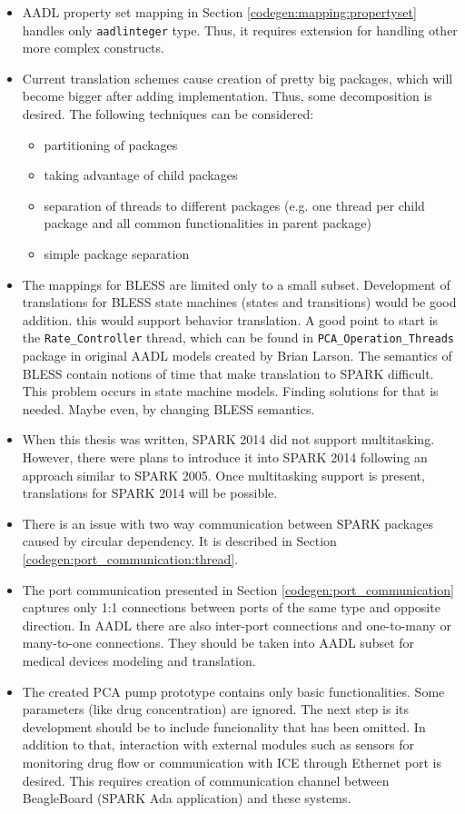 \begin{itemize}
	\item AADL property set mapping in Section \ref{codegen:mapping:propertyset} handles only \lstinline{aadlinteger} type. Thus, it requires extension for handling other more complex constructs.
	\item Current translation schemes cause creation of pretty big packages, which will become bigger after adding implementation. Thus, some decomposition is desired. The following techniques can be considered: 
		\begin{itemize}
			\item partitioning of packages
			\item taking advantage of child packages
			\item separation of threads to different packages (e.g. one thread per child package and all common functionalities in parent package)
			\item simple package separation
		\end{itemize} 
	\item The mappings for BLESS are limited only to a small subset. Development of translations for BLESS state machines (states and transitions) would be good addition. this would support behavior translation. A good point to start is the \lstinline{Rate_Controller} thread, which can be found in \lstinline{PCA_Operation_Threads} package in original AADL models created by Brian Larson. The semantics of BLESS contain notions of time that make translation to SPARK difficult. This problem occurs in state machine models. Finding solutions for that is needed. Maybe even, by changing BLESS semantics.
	\item When this thesis was written, SPARK 2014 did not support multitasking. However, there were plans to introduce it into SPARK 2014 following an approach similar to SPARK 2005. Once multitasking support is present, translations for SPARK 2014 will be possible.
	\item There is an issue with two way communication between SPARK packages caused by circular dependency. It is described in Section \ref{codegen:port_communication:thread}.
	\item The port communication presented in Section \ref{codegen:port_communication} captures only 1:1 connections between ports of the same type and opposite direction. In AADL there are also inter-port connections and one-to-many or many-to-one connections. \cite{AadlBook} They should be taken into AADL subset for medical devices modeling and translation. 
	\item The created PCA pump prototype contains only basic functionalities. Some parameters (like drug concentration) are ignored. The next step is its development should be to include funcionality that has been omitted. In addition to that, interaction with external modules such as sensors for monitoring drug flow or communication with ICE through Ethernet port is desired. This requires creation of communication channel between BeagleBoard (SPARK Ada application) and these systems. 		
\end{itemize}
